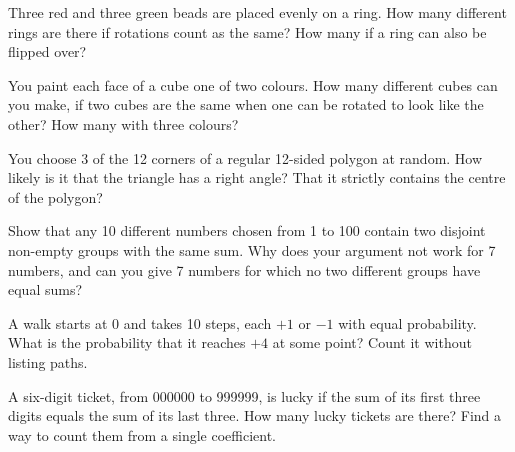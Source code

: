 \begin{question}\label{iq:iv1:counting-and-symmetry:30}
Three red and three green beads are placed evenly on a ring. How many different rings are there if rotations count as the same? How many if a ring can also be flipped over?
\end{question}

\begin{question}\label{iq:iv1:counting-and-symmetry:31}
You paint each face of a cube one of two colours. How many different cubes can you make, if two cubes are the same when one can be rotated to look like the other? How many with three colours?
\end{question}

\begin{question}\label{iq:iv1:counting-and-symmetry:32}
You choose 3 of the 12 corners of a regular 12-sided polygon at random. How likely is it that the triangle has a right angle? That it strictly contains the centre of the polygon?
\end{question}

\begin{question}\label{iq:iv1:counting-and-symmetry:33}
Show that any 10 different numbers chosen from 1 to 100 contain two disjoint non-empty groups with the same sum. Why does your argument not work for 7 numbers, and can you give 7 numbers for which no two different groups have equal sums?
\end{question}

\begin{question}\label{iq:iv1:counting-and-symmetry:34}
A walk starts at 0 and takes 10 steps, each $+1$ or $-1$ with equal probability. What is the probability that it reaches $+4$ at some point? Count it without listing paths.
\end{question}

\begin{question}\label{iq:iv1:counting-and-symmetry:35}
A six-digit ticket, from 000000 to 999999, is lucky if the sum of its first three digits equals the sum of its last three. How many lucky tickets are there? Find a way to count them from a single coefficient.
\end{question}

